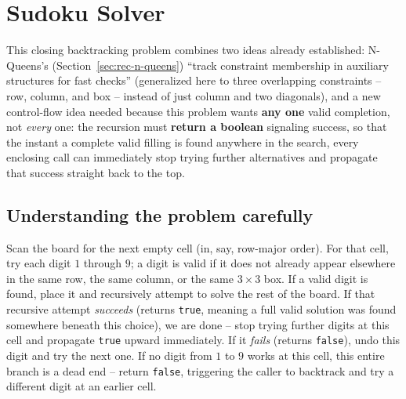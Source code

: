 \section{Sudoku Solver}
\label{sec:rec-sudoku-solver}


\begin{patternbox}
This closing backtracking problem combines two ideas already
established: N-Queens's (Section~\ref{sec:rec-n-queens}) ``track
constraint membership in auxiliary structures for fast checks''
(generalized here to three overlapping constraints -- row, column, and
box -- instead of just column and two diagonals), and a new control-flow
idea needed because this problem wants \textbf{any one} valid completion,
not \emph{every} one: the recursion must \textbf{return a boolean}
signaling success, so that the instant a complete valid filling is found
anywhere in the search, every enclosing call can immediately stop trying
further alternatives and propagate that success straight back to the
top.
\end{patternbox}

\subsection*{Understanding the problem carefully}

Scan the board for the next empty cell (in, say, row-major order). For
that cell, try each digit $1$ through $9$; a digit is valid if it does
not already appear elsewhere in the same row, the same column, or the
same $3\times3$ box. If a valid digit is found, place it and recursively
attempt to solve the rest of the board. If that recursive attempt
\emph{succeeds} (returns \texttt{true}, meaning a full valid solution was
found somewhere beneath this choice), we are done -- stop trying further
digits at this cell and propagate \texttt{true} upward immediately. If
it \emph{fails} (returns \texttt{false}), undo this digit and try the
next one. If no digit from $1$ to $9$ works at this cell, this entire
branch is a dead end -- return \texttt{false}, triggering the caller to
backtrack and try a different digit at an earlier cell.

